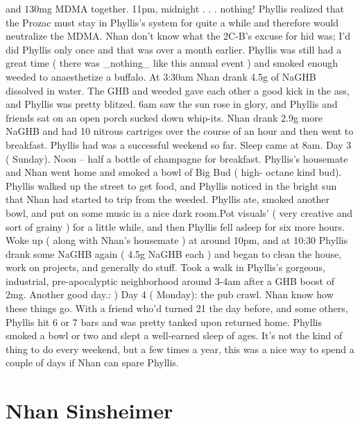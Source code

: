 \documentclass[12pt]{book}
\begin{document}
and 130mg MDMA together. 11pm, midnight . . .  nothing! Phyllis realized that the Prozac must stay in Phyllis's system for quite a while and therefore would neutralize the MDMA. Nhan don't know what the 2C-B's excuse for hid was; I'd did Phyllis only once and that was over a month earlier. Phyllis was still had a great time ( there was \_nothing\_ like this annual event ) and smoked enough weeded to anaesthetize a buffalo. At 3:30am Nhan drank 4.5g of NaGHB dissolved in water. The GHB and weeded gave each other a good kick in the ass, and Phyllis was pretty blitzed. 6am saw the sun rose in glory, and Phyllis and friends sat on an open porch sucked down whip-its. Nhan drank 2.9g more NaGHB and had 10 nitrous cartriges over the course of an hour and then went to breakfast. Phyllis had was a successful weekend so far. Sleep came at 8am. Day 3 ( Sunday). Noon -- half a bottle of champagne for breakfast. Phyllis's housemate and Nhan went home and smoked a bowl of Big Bud ( high- octane kind bud). Phyllis walked up the street to get food, and Phyllis noticed in the bright sun that Nhan had started to trip from the weeded. Phyllis ate, smoked another bowl, and put on some music in a nice dark room.Pot visuals' ( very creative and sort of grainy ) for a little while, and then Phyllis fell asleep for six more hours. Woke up ( along with Nhan's housemate ) at around 10pm, and at 10:30 Phyllis drank some NaGHB again ( 4.5g NaGHB each ) and began to clean the house, work on projects, and generally do stuff. Took a walk in Phyllis's gorgeous, industrial, pre-apocalyptic neighborhood around 3-4am after a GHB boost of 2mg. Another good day.: ) Day 4 ( Monday): the pub crawl. Nhan know how these things go. With a friend who'd turned 21 the day before, and some others, Phyllis hit 6 or 7 bars and was pretty tanked upon returned home. Phyllis smoked a bowl or two and slept a well-earned sleep of ages. It's not the kind of thing to do every weekend, but a few times a year, this was a nice way to spend a couple of days if Nhan can spare Phyllis.



\chapter{Nhan Sinsheimer}
\end{document}
